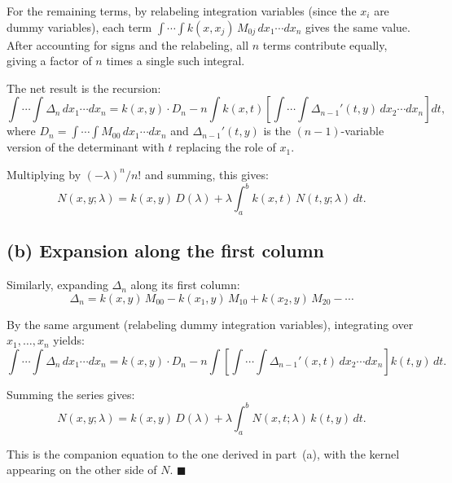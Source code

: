 \documentclass[12pt]{article}
\begin{document}
For the remaining terms, by relabeling integration variables (since the $x_i$ are dummy variables), each term $\int\cdots\int k(x,x_j)\,M_{0j}\,dx_1\cdots dx_n$ gives the same value. After accounting for signs and the relabeling, all $n$ terms contribute equally, giving a factor of $n$ times a single such integral.

The net result is the recursion:
\[
\int \cdots \int \Delta_n\,dx_1\cdots dx_n = k(x,y)\cdot D_n - n\int k(x,t)\left[\int\cdots\int \Delta_{n-1}'(t,y)\,dx_2\cdots dx_n\right]dt,
\]
where $D_n = \int\cdots\int M_{00}\,dx_1\cdots dx_n$ and $\Delta_{n-1}'(t,y)$ is the $(n-1)$-variable version of the determinant with $t$ replacing the role of $x_1$.

Multiplying by $(-\lambda)^n/n!$ and summing, this gives:
\[
\boxed{N(x,y;\lambda) = k(x,y)\,D(\lambda) + \lambda \int_a^b k(x,t)\,N(t,y;\lambda)\,dt}.
\]

\subsection*{(b) Expansion along the first column}

Similarly, expanding $\Delta_n$ along its first column:
\[
\Delta_n = k(x,y)\,M_{00} - k(x_1,y)\,M_{10} + k(x_2,y)\,M_{20} - \cdots
\]

By the same argument (relabeling dummy integration variables), integrating over $x_1, \ldots, x_n$ yields:
\[
\int \cdots \int \Delta_n\,dx_1\cdots dx_n = k(x,y)\cdot D_n - n\int \left[\int\cdots\int \Delta_{n-1}'(x,t)\,dx_2\cdots dx_n\right]k(t,y)\,dt.
\]

Summing the series gives:
\[
\boxed{N(x,y;\lambda) = k(x,y)\,D(\lambda) + \lambda \int_a^b N(x,t;\lambda)\,k(t,y)\,dt}.
\]

This is the companion equation to the one derived in part~(a), with the kernel appearing on the other side of $N$. \hfill $\blacksquare$
\end{document}
